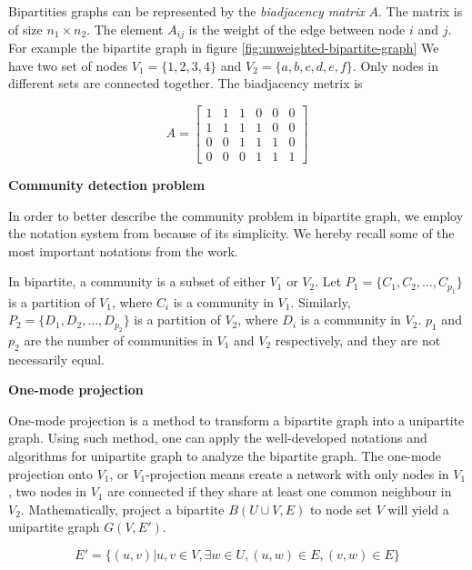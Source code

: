 Bipartities graphs can be represented by the \textit{biadjacency matrix} $A$.
The matrix is of size $n_1 \times n_2$.
The element $A_{ij}$ is the weight of the edge between node $i$ and $j$.
For example the bipartite graph in figure \ref{fig:unweighted-bipartite-graph}
We have two set of nodes $V_1 = \{1, 2, 3, 4\}$ and $V_2 = \{a, b, c, d, e, f\}$.
Only nodes in different sets are connected together.
The biadjacency metrix is

\begin{equation*}
	A =
	\begin{bmatrix}
		1 & 1 & 1 & 0 & 0 & 0 \\
		1 & 1 & 1 & 1 & 0 & 0 \\
		0 & 0 & 1 & 1 & 1 & 0 \\
		0 & 0 & 0 & 1 & 1 & 1
	\end{bmatrix}
\end{equation*}

\textbf{Community detection problem}

In order to better describe the community problem in bipartite graph,
we employ the notation system from \parencite{pesantez2018} because of its simplicity.
We hereby recall some of the most important notations from the work.

In bipartite, a community is a subset of either $V_1$ or $V_2$.
Let $P_1 = \{C_1, C_2, \ldots, C_{p_1}\}$ is a partition of $V_1$,
where $C_i$ is a community in $V_1$.
Similarly, $P_2 = \{D_1, D_2, \ldots, D_{p_2}\}$ is a partition of $V_2$,
where $D_i$ is a community in $V_2$.
$p_1$ and $p_2$ are the number of communities in $V_1$ and $V_2$ respectively,
and they are not necessarily equal.


\textbf{One-mode projection}

One-mode projection is a method to transform a bipartite graph into a unipartite graph.
Using such method, one can apply the well-developed notations and algorithms for unipartite graph to analyze the bipartite graph.
The one-mode projection onto $V_1$, or $V_1$-projection means create a network with only nodes in $V_1$,
two nodes in $V_1$ are connected if they share at least one common neighbour in $V_2$.
Mathematically, project a bipartite $B(U\cup V, E)$ to node set $V$
will yield a unipartite graph $G(V, E')$.

\begin{equation*}
	E' = \{(u, v) | u, v \in V, \exists w \in U, (u, w) \in E, (v, w) \in E\}
\end{equation*}

